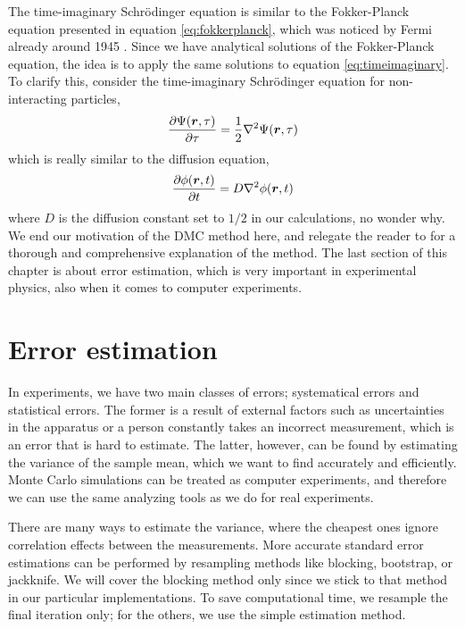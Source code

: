 The time-imaginary Schrödinger equation is similar to the Fokker-Planck equation presented in equation \eqref{eq:fokkerplanck}, which was noticed by Fermi already around 1945 \cite{metropolis_monte_1949,ceperley_quantum_1986}. Since we have analytical solutions of the Fokker-Planck equation, the idea is to apply the same solutions to equation \ref{eq:timeimaginary}. To clarify this, consider the time-imaginary Schrödinger equation for non-interacting particles,
\begin{equation}
\frac{\partial\Psi(\boldsymbol{{r}},\tau)}{\partial\tau}=\frac{1}{2}\nabla^2\Psi(\boldsymbol{{r}},\tau)
\end{equation}
which is really similar to the diffusion equation,
\begin{equation}
\frac{\partial\phi(\boldsymbol{{r}},t)}{\partial t}=D\nabla^2\phi(\boldsymbol{{r}},t)
\end{equation}
where $D$ is the diffusion constant set to $1/2$ in our calculations, no wonder why. We end our motivation of the DMC method here, and relegate the reader to \citet{kosztin_introduction_1996} for a thorough and comprehensive explanation of the method. The last section of this chapter is about error estimation, which is very important in experimental physics, also when it comes to computer experiments. 

\section{Error estimation} \label{sec:variance}
In experiments, we have two main classes of errors; systematical errors and statistical errors. The former is a result of external factors such as uncertainties in the apparatus or a person constantly takes an incorrect measurement, which is an error that is hard to estimate. The latter, however, can be found by estimating the variance of the sample mean, which we want to find accurately and efficiently. Monte Carlo simulations can be treated as computer experiments, and therefore we can use the same analyzing tools as we do for real experiments.

There are many ways to estimate the variance, where the cheapest ones ignore correlation effects between the measurements. More accurate standard error estimations can be performed by resampling methods like blocking, bootstrap, or jackknife. We will cover the blocking method only since we stick to that method in our particular implementations. To save computational time, we resample the final iteration only; for the others, we use the simple estimation method.

